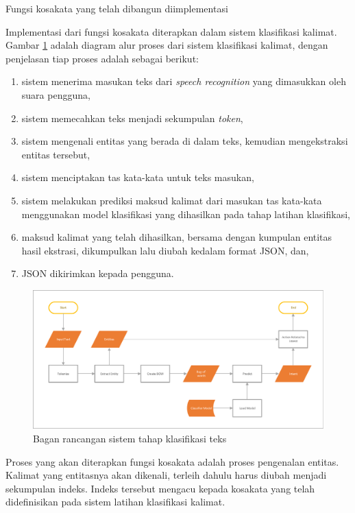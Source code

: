 Fungsi kosakata yang telah dibangun diimplementasi

Implementasi dari fungsi kosakata diterapkan dalam sistem klasifikasi kalimat. Gambar \ref{fig:design_classification} adalah diagram alur proses dari sistem klasifikasi kalimat, dengan penjelasan tiap proses adalah sebagai berikut:

\begin{enumerate}
	\item sistem menerima masukan teks dari \textit{speech recognition} yang dimasukkan oleh suara pengguna,
	\item sistem memecahkan teks menjadi sekumpulan \textit{token},
	\item sistem mengenali entitas yang berada di dalam teks, kemudian mengekstraksi entitas tersebut,
	\item sistem menciptakan tas kata-kata untuk teks masukan,
	\item sistem melakukan prediksi maksud kalimat dari masukan tas kata-kata menggunakan model klasifikasi yang dihasilkan pada tahap latihan klasifikasi,
	\item maksud kalimat yang telah dihasilkan, bersama dengan kumpulan entitas hasil ekstrasi, dikumpulkan lalu diubah kedalam format JSON, dan,
	\item JSON dikirimkan kepada pengguna.
\end{enumerate}

\begin{figure}[H]
	\centering
	\includegraphics[width=\textwidth, trim=2 2 2 2, clip]{resources/4/design_classification.pdf}
	\caption{Bagan rancangan sistem tahap klasifikasi teks}
	\label{fig:design_classification}
\end{figure}

Proses yang akan diterapkan fungsi kosakata adalah proses pengenalan entitas. Kalimat yang entitasnya akan dikenali, terleih dahulu harus diubah menjadi sekumpulan indeks. Indeks tersebut mengacu kepada kosakata yang telah didefinisikan pada sistem latihan klasifikasi kalimat.

